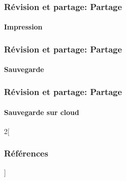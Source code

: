\documentclass[xcolor=table]{beamer}
\begin{document}
\begin{frame}
\frametitle{Révision et partage: Partage}
\framesubtitle{Impression}

\end{frame}

\begin{frame}
\frametitle{Révision et partage: Partage}
\framesubtitle{Sauvegarde}

\end{frame}

\begin{frame}
\frametitle{Révision et partage: Partage}
\framesubtitle{Sauvegarde sur cloud}


\end{frame}

\nocite{*}
%
% 

\begin{multicols*}{2}[\frametitle{Références}]%
	\tiny
	
	
\end{multicols*}
\end{document}
